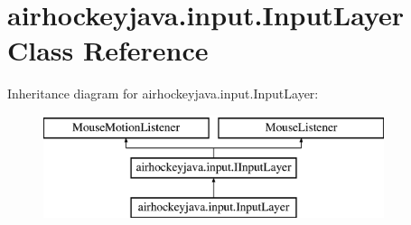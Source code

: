 \hypertarget{classairhockeyjava_1_1input_1_1_input_layer}{}\section{airhockeyjava.\+input.\+Input\+Layer Class Reference}
\label{classairhockeyjava_1_1input_1_1_input_layer}
Inheritance diagram for airhockeyjava.\+input.\+Input\+Layer\+:\begin{figure}[H]
\begin{center}
\leavevmode
\includegraphics[height=3.000000cm]{classairhockeyjava_1_1input_1_1_input_layer}
\end{center}
\end{figure}
